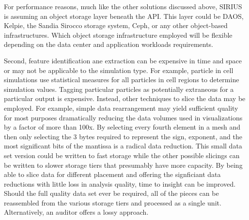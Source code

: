 For performance reasons, much like the other solutions discussed above, SIRIUS
is assuming an object storage layer beneath the API. This layer could be DAOS,
Kelpie, the Sandia Sirocco storage system, Ceph, or any other object-based
infrastructures. Which object storage infrastructure employed will be flexible
depending on the data center and application workloads requirements.

Second, feature identification ane extraction can be expensive in time and
space or may not be applicable to the simulation type. For example, particle in
cell simulations use statistical measures for all particles in cell regions to
determine simulation values. Tagging particular particles as potentially
extraneous for a particular output is expensive. Instead, other techniques to
slice the data may be employed. For example, simple data rearrangement may
yield sufficient quality for most purposes dramatically reducing the data
volumes used in visualizations by a factor of more than 100x. By selecting
every fourth element in a mesh and then only selecting the 3 bytes required to
represent the sign, exponent, and the most significant bits of the mantissa is
a radical data reduction. This small data set version could be written to fast
storage while the other possible slicings can be written to slower storage
tiers that presumably have more capacity. By being able to slice data for
different placement and offering the signficiant data reductions with little
loss in analysis quality, time to insight can be improved. Should the full
quality data set ever be required, all of the pieces can be reassembled from
the various storage tiers and processed as a single unit. Alternatively, an
auditor offers a lossy approach.

